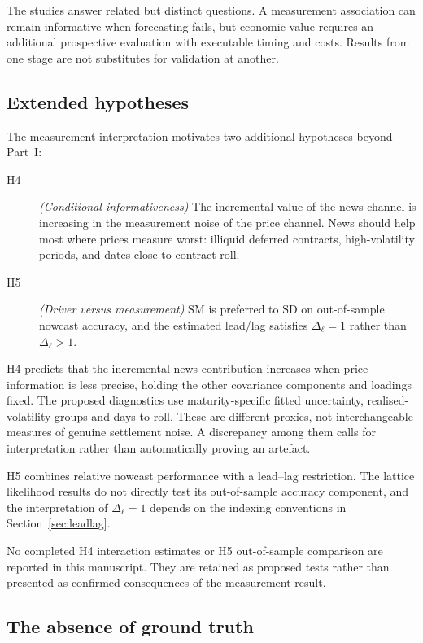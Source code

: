 \documentclass[journal]{IEEEtran}
\begin{document}
The studies answer related but distinct questions. A measurement association can remain informative when forecasting fails, but economic value requires an additional prospective evaluation with executable timing and costs. Results from one stage are not substitutes for validation at another.

\subsection{Extended hypotheses}
\label{sec:h4}

The measurement interpretation motivates two additional hypotheses beyond Part~I:
\begin{description}
  \item[H4] \textit{(Conditional informativeness)} The incremental value of the news channel is increasing in the measurement noise of the price channel. News should help most where prices measure worst: illiquid deferred contracts, high-volatility periods, and dates close to contract roll.
  \item[H5] \textit{(Driver versus measurement)} $\mathrm{SM}$ is preferred to $\mathrm{SD}$ on out-of-sample nowcast accuracy, and the estimated lead/lag satisfies $\Delta_\ell = 1$ rather than $\Delta_\ell > 1$.
\end{description}

H4 predicts that the incremental news contribution increases when price information is less precise, holding the other covariance components and loadings fixed. The proposed diagnostics use maturity-specific fitted uncertainty, realised-volatility groups and days to roll. These are different proxies, not interchangeable measures of genuine settlement noise. A discrepancy among them calls for interpretation rather than automatically proving an artefact.

H5 combines relative nowcast performance with a lead--lag restriction. The lattice likelihood results do not directly test its out-of-sample accuracy component, and the interpretation of $\Delta_\ell=1$ depends on the indexing conventions in Section~\ref{sec:leadlag}.

No completed H4 interaction estimates or H5 out-of-sample comparison are reported in this manuscript. They are retained as proposed tests rather than presented as confirmed consequences of the measurement result.

\subsection{The absence of ground truth}
\label{sec:groundtruth}
\end{document}
